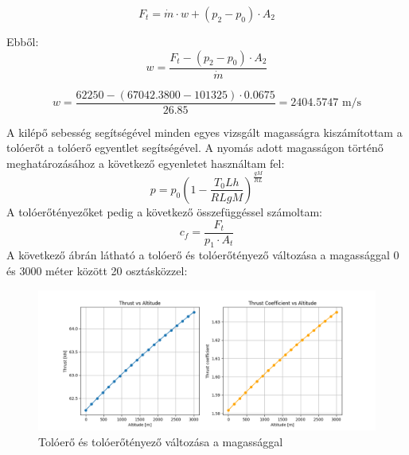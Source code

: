 \documentclass[a4paper,12pt]{article}
\begin{document}
\[
F_t = \dot{m} \cdot w + (p_2 - p_0) \cdot A_2
\]

Ebből:
\[
w  = \frac{F_t - (p_2 - p_0) \cdot A_2}{\dot{m}}
\]

\[ w = \frac{62250 - (67042.3800 - 101325) \cdot 0.0675}{26.85} = 2404.5747 \text{ m/s} \]

A kilépő sebesség segítségével minden egyes vizsgált magasságra kiszámítottam a tolóerőt a tolóerő egyentlet segítségével.
A nyomás adott magasságon történő meghatározásához a következő egyenletet használtam fel:
\[ p = p_0 \left(1 - \frac{T_0 L h}{R L g M}\right)^{\frac{g M}{R L}} \]
A tolóerőtényezőket pedig a következő összefüggéssel számoltam:
\[
c_f = \frac{F_t}{p_1 \cdot A_t}
\]
A következő ábrán látható a tolóerő és tolóerőtényező változása a magassággal 0 és 3000 méter között 20 osztásközzel:
\begin{figure}[H]
    \centering
    \includegraphics[width=1\textwidth]{images/plots.png}
    \caption{Tolóerő és tolóerőtényező változása a magassággal}
    \label{fig:rocket_force}
\end{figure}
\end{document}
